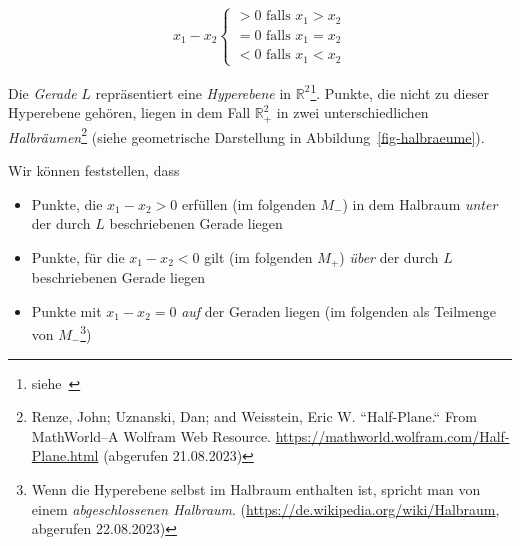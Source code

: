 \begin{equation}
x_1 - x_2 \begin{cases}
               > 0 \text{ falls } x_1 > x_2 \\
               = 0 \text{ falls } x_1 = x_2 \\
               < 0 \text{ falls } x_1 < x_2
\end{cases}
\end{equation}

Die \textit{Gerade} $L$ repräsentiert eine \textit{Hyperebene} in $\mathbb{R}^2$\footnote{
    siehe~\cite[81, Definition 2.3]{BHW+12}
}.
Punkte, die nicht zu dieser Hyperebene gehören, liegen in dem Fall $\mathbb{R}_+^2$ in zwei unterschiedlichen \textit{Halbräumen}\footnote{
    Renze, John; Uznanski, Dan; and Weisstein, Eric W. ``Half-Plane.`` From MathWorld--A Wolfram Web Resource. \url{https://mathworld.wolfram.com/Half-Plane.html} (abgerufen 21.08.2023)
} (siehe geometrische Darstellung in Abbildung~\ref{fig-halbraeume}).

Wir können feststellen, dass


\begin{itemize}
    \item Punkte, die $x_1 - x_2 > 0$ erfüllen (im folgenden $M_-$) in dem Halbraum \textit{unter} der durch $L$ beschriebenen Gerade liegen
    \item Punkte, für die  $x_1 - x_2 < 0$ gilt (im folgenden $M_+$) \textit{über} der durch $L$ beschriebenen Gerade liegen
    \item Punkte mit $x_1 - x_2 = 0$ \textit{auf} der Geraden liegen (im folgenden als Teilmenge von $M_-$\footnote{
        Wenn die Hyperebene selbst im Halbraum enthalten ist, spricht man von einem \textit{abgeschlossenen Halbraum}. (\url{https://de.wikipedia.org/wiki/Halbraum}, abgerufen 22.08.2023)
    })
\end{itemize}


